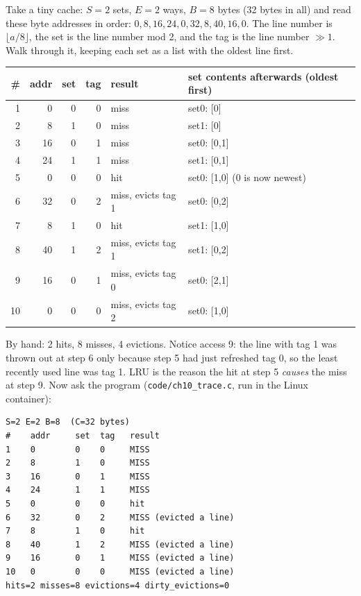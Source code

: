 \begin{example}
Take a tiny cache: \(S{=}2\) sets, \(E{=}2\) ways, \(B{=}8\) bytes
(32 bytes in all) and read these byte addresses in order:
\(0,8,16,24,0,32,8,40,16,0\). The line number is \(\lfloor a/8\rfloor\),
the set is the line number mod 2, and the tag is the line number \(\gg 1\).
Walk through it, keeping each set as a list with the oldest line first.

\begin{center}\small
\begin{tabular}{@{}rrrrll@{}}
\toprule
\# & addr & set & tag & result & set contents afterwards (oldest first) \\
\midrule
1 &  0 & 0 & 0 & miss & set0: [0] \\
2 &  8 & 1 & 0 & miss & set1: [0] \\
3 & 16 & 0 & 1 & miss & set0: [0,1] \\
4 & 24 & 1 & 1 & miss & set1: [0,1] \\
5 &  0 & 0 & 0 & hit  & set0: [1,0] (0 is now newest) \\
6 & 32 & 0 & 2 & miss, evicts tag 1 & set0: [0,2] \\
7 &  8 & 1 & 0 & hit  & set1: [1,0] \\
8 & 40 & 1 & 2 & miss, evicts tag 1 & set1: [0,2] \\
9 & 16 & 0 & 1 & miss, evicts tag 0 & set0: [2,1] \\
10 &  0 & 0 & 0 & miss, evicts tag 2 & set0: [1,0] \\
\bottomrule
\end{tabular}
\end{center}
\noindent By hand: 2 hits, 8 misses, 4 evictions. Notice access 9: the
line with tag 1 was thrown out at step 6 only because step 5 had just
refreshed tag 0, so the least recently used line was tag 1. LRU is the
reason the hit at step 5 \emph{causes} the miss at step 9. Now ask the
program (\texttt{code/ch10\_trace.c}, run in the Linux container):

\begin{lstlisting}[language={},caption={\texttt{./ch10\_trace 2 2 8 0 8 16 24 0 32 8 40 16 0}.
The machine agrees with the hand trace line for line.}]
S=2 E=2 B=8  (C=32 bytes)
#    addr     set  tag   result
1    0        0    0     MISS
2    8        1    0     MISS
3    16       0    1     MISS
4    24       1    1     MISS
5    0        0    0     hit 
6    32       0    2     MISS (evicted a line)
7    8        1    0     hit 
8    40       1    2     MISS (evicted a line)
9    16       0    1     MISS (evicted a line)
10   0        0    0     MISS (evicted a line)
hits=2 misses=8 evictions=4 dirty_evictions=0
\end{lstlisting}
\end{example}

